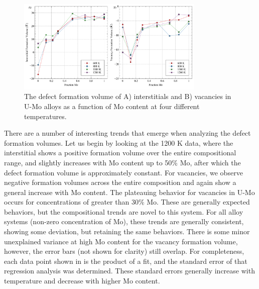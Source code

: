 \documentclass[review]{elsarticle}
\begin{document}
\begin{figure}[h!]
    \centering
    \includegraphics[width=0.8\textwidth]{form_vol.pdf}
    \caption{The defect formation volume of A) interstitials and B) vacancies in U-Mo alloys as a function of Mo content at four different temperatures.}
    \label{fig:form_vol}
\end{figure}

There are a number of interesting trends that emerge when analyzing the defect formation volumes. Let us begin by looking at the 1200 K data, where the interstitial shows a positive formation volume over the entire compositional range, and slightly increases with Mo content up to 50\% Mo, after which the defect formation volume is approximately constant. For vacancies, we observe negative formation volumes across the entire composition and again show a general increase with Mo content. The plateauing behavior for vacancies in U-Mo occurs for concentrations of greater than 30\% Mo. These are generally expected behaviors, but the compositional trends are novel to this system. For all alloy systems (non-zero concentration of Mo), these trends are generally consistent, showing some deviation, but retaining the same behaviors. There is some minor unexplained variance at high Mo content for the vacancy formation volume, however, the error bars (not shown for clarity) still overlap. For completeness, each data point shown in  is the product of a fit, and the standard error of that regression analysis was determined. These standard errors generally increase with temperature and decrease with higher Mo content. 
\end{document}
